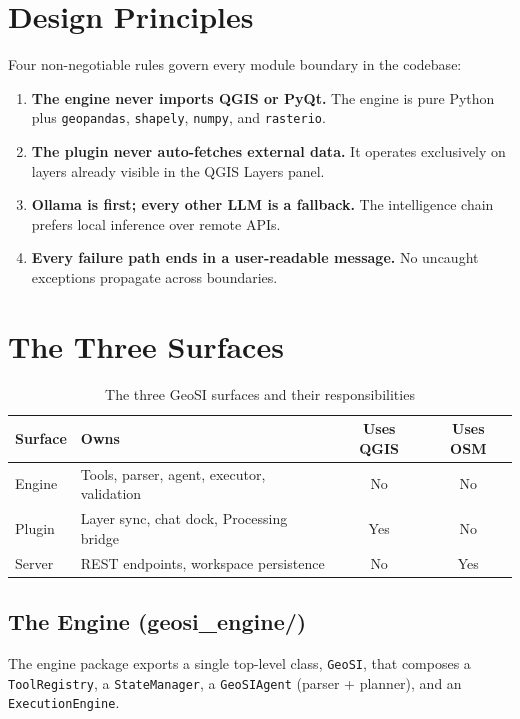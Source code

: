 \documentclass[12pt,a4paper]{report}
\begin{document}
\section{Design Principles}

Four non-negotiable rules govern every module boundary in the codebase:

\begin{enumerate}
  \item \textbf{The engine never imports QGIS or PyQt.}  The engine is pure Python plus \texttt{geopandas}, \texttt{shapely}, \texttt{numpy}, and \texttt{rasterio}.
  \item \textbf{The plugin never auto-fetches external data.}  It operates exclusively on layers already visible in the QGIS Layers panel.
  \item \textbf{Ollama is first; every other LLM is a fallback.}  The intelligence chain prefers local inference over remote APIs.
  \item \textbf{Every failure path ends in a user-readable message.}  No uncaught exceptions propagate across boundaries.
\end{enumerate}

\section{The Three Surfaces}

\begin{table}[ht]
\centering
\caption{The three GeoSI surfaces and their responsibilities}
\begin{tabular}{llcc}
\toprule
\textbf{Surface} & \textbf{Owns} & \textbf{Uses QGIS} & \textbf{Uses OSM} \\
\midrule
Engine  & Tools, parser, agent, executor, validation & No  & No  \\
Plugin  & Layer sync, chat dock, Processing bridge   & Yes & No  \\
Server  & REST endpoints, workspace persistence      & No  & Yes \\
\bottomrule
\end{tabular}
\end{table}

\subsection{The Engine (geosi\_engine/)}

The engine package exports a single top-level class, \texttt{GeoSI}, that composes a \texttt{ToolRegistry}, a \texttt{StateManager}, a \texttt{GeoSIAgent} (parser + planner), and an \texttt{ExecutionEngine}.
\end{document}
